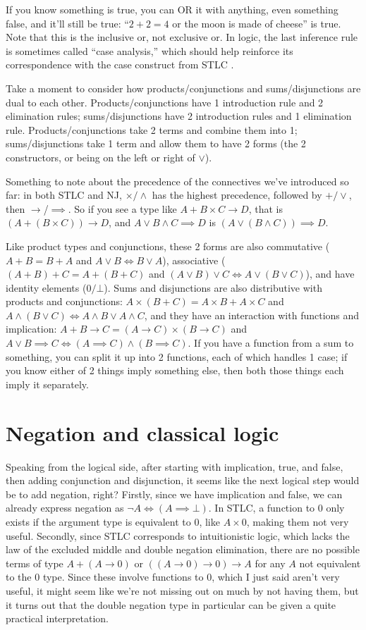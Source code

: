 \documentclass[12pt]{article}
\begin{document}
If you know something is true, you can OR it with anything, even something false, and it'll still be true: ``$2 + 2 = 4$ or the moon is made of cheese'' is true. Note that this is the inclusive or, not exclusive or. In logic, the last inference rule is sometimes called ``case analysis,'' which should help reinforce its correspondence with the case construct from STLC \cite{farooqui}.

Take a moment to consider how products/conjunctions and sums/disjunctions are dual to each other. Products/conjunctions have 1 introduction rule and 2 elimination rules; sums/disjunctions have 2 introduction rules and 1 elimination rule. Products/conjunctions take 2 terms and combine them into 1; sums/disjunctions take 1 term and allow them to have 2 forms (the 2 constructors, or being on the left or right of $\lor$).

Something to note about the precedence of the connectives we've introduced so far: in both STLC and NJ, $\times/\land$ has the highest precedence, followed by $+/\lor$, then $\to$/$\implies$. So if you see a type like $A + B \times C \to D$, that is $(A + (B \times C)) \to D$, and $A \lor B \land C \implies D$ is $(A \lor (B \land C)) \implies D$.

Like product types and conjunctions, these 2 forms are also commutative ($A + B = B + A$ and $A \lor B \iff B \lor A$), associative ($(A + B) + C = A + (B + C)$ and $(A \lor B) \lor C \iff A \lor (B \lor C)$), and have identity elements ($0/\bot$). Sums and disjunctions are also distributive with products and conjunctions: $A \times (B + C) = A \times B + A \times C$ and $A \land (B \lor C) \iff A \land B \lor A \land C$, and they have an interaction with functions and implication: $A + B \to C = (A \to C) \times (B \to C)$ and $A \lor B \implies C \iff (A \implies C) \land (B \implies C)$. If you have a function from a sum to something, you can split it up into 2 functions, each of which handles 1 case; if you know either of 2 things imply something else, then both those things each imply it separately.

\section{Negation and classical logic}

Speaking from the logical side, after starting with implication, true, and false, then adding conjunction and disjunction, it seems like the next logical step would be to add negation, right? Firstly, since we have implication and false, we can already express negation as $\neg A \iff (A \implies \bot)$. In STLC, a function to 0 only exists if the argument type is equivalent to 0, like $A \times 0$, making them not very useful. Secondly, since STLC corresponds to intuitionistic logic, which lacks the law of the excluded middle and double negation elimination, there are no possible terms of type $A + (A \to 0)$ or $((A \to 0) \to 0) \to A$ for any $A$ not equivalent to the 0 type. Since these involve functions to 0, which I just said aren't very useful, it might seem like we're not missing out on much by not having them, but it turns out that the double negation type in particular can be given a quite practical interpretation.
\end{document}
